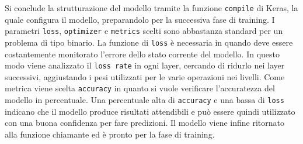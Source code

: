 Si conclude la strutturazione del modello tramite la funzione \texttt{compile} di Keras, la quale configura il modello, preparandolo per la successiva fase di training. I parametri \texttt{loss}, \texttt{optimizer} e \texttt{metrics} scelti sono abbastanza standard per un problema di tipo binario. La funzione di \texttt{loss} è necessaria in quando deve essere costantemente monitorato l’errore dello stato corrente del modello. In questo modo viene analizzato il \texttt{loss rate} in ogni layer, cercando di ridurlo nei layer successivi, aggiustando i pesi utilizzati per le varie operazioni nei livelli. Come metrica viene scelta \texttt{accuracy} in quanto si vuole verificare l’accuratezza del modello in percentuale. Una percentuale alta di \texttt{accuracy} e una bassa di \texttt{loss} indicano che il modello produce risultati attendibili e può essere quindi utilizzato con una buona confidenza per fare predizioni. Il modello viene infine ritornato alla funzione chiamante ed è pronto per la fase di training.
